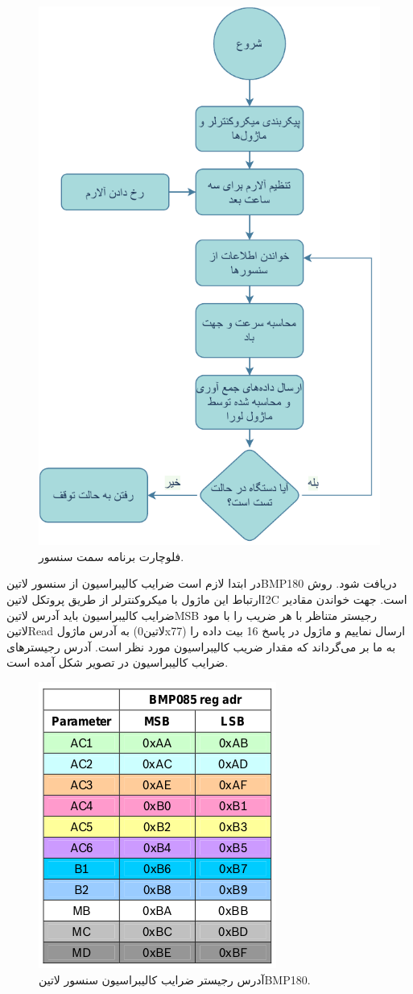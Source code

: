 \begin{figure}[H]
	\centering
	\includegraphics[width=0.6\linewidth]{Assets/SensorFlowChart.pdf}
	\caption{فلوچارت برنامه سمت سنسور.}
	\label{fig:SensorFlowChart}
\end{figure}

در ابتدا لازم است ضرایب کالیبراسیون از سنسور ‌لاتین{BMP180} دریافت شود. روش ارتباط این ماژول با میکروکنترلر از طریق پروتکل ‌لاتین{I2C} است. جهت خواندن مقادیر ضرایب کالیبراسیون باید آدرس ‌لاتین{MSB} رجیستر متناظر با هر ضریب را با مود ‌لاتین{Read} به آدرس ماژول (‌لاتین{0x77}) ارسال نماییم و ماژول در پاسخ 16 بیت داده را به ما بر می‌گرداند که مقدار ضریب کالیبراسیون مورد نظر است. آدرس رجیستر‌های ضرایب کالیبراسیون در تصویر شکل  آمده است.
\begin{figure}[H]
	\centering
	\includegraphics[width=0.5\linewidth]{Assets/bmp180Calibrationcoefficient.png}
	\caption{آدرس رجیستر ضرایب کالیبراسیون سنسور ‌لاتین{BMP180}.}
	\label{fig:bmp180Calibrationcoefficient}
\end{figure}

